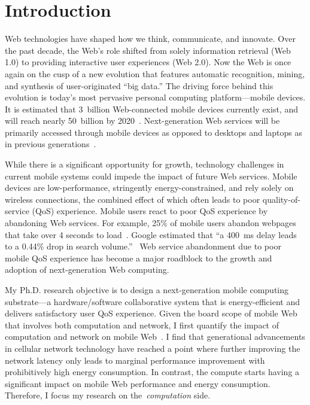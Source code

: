
\chapter{Introduction}
\label{sec:intro}

Web technologies have shaped how we think, communicate, and innovate. Over the past decade, the Web's role shifted from solely information retrieval (Web 1.0) to providing interactive user experiences (Web 2.0). Now the Web is once again on the cusp of a new evolution that features automatic recognition, mining, and synthesis of user-originated ``big data.'' The driving force behind this evolution is today's most pervasive personal computing platform---mobile devices. It is estimated that 3~billion Web-connected mobile devices currently exist, and will reach nearly 50~billion by 2020~\cite{Evans:2011ys}.  Next-generation Web services will be primarily accessed through mobile devices as opposed to desktops and laptops as in previous generations~\cite{KPCB-Internet-Trends15}.

While there is a significant opportunity for growth, technology challenges in current mobile systems could impede the impact of future Web services. Mobile devices are low-performance, stringently energy-constrained, and rely solely on wireless connections, the combined effect of which often leads to poor quality-of-service (QoS) experience. Mobile users react to poor QoS experience by abandoning Web services. For example, 25\% of mobile users abandon webpages that take over 4 seconds to load~\cite{web:kiss}. Google estimated that ``a 400~ms delay leads to a 0.44\% drop in search volume.''~\cite{web:google} Web service abandonment due to poor mobile QoS experience has become a major roadblock to the growth and adoption of next-generation Web computing.

My Ph.D. research objective is to design a next-generation mobile computing substrate---a hardware/software collaborative system that is energy-efficient and delivers satisfactory user QoS experience. Given the board scope of mobile Web that involves both computation and network, I first quantify the impact of computation and network on mobile Web~\cite{zhu2015role}. I find that generational advancements in cellular network technology have reached a point where further improving the network latency only leads to marginal performance improvement with prohibitively high energy consumption. In contrast, the compute starts having a significant impact on mobile Web performance and energy consumption. Therefore, I focus my research on the~\textit{computation} side.

